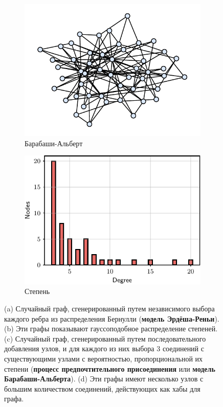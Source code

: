\begin{figure}[t]
\begin{subfigure}[b]{0.24\textwidth}
    \includegraphics[width=\textwidth]{images/graph_2}
    \caption{Барабаши-Альберт}
    \end{subfigure}
    \begin{subfigure}[b]{0.24\textwidth}
    \includegraphics[width=\textwidth]{images/graph_2_degree}
    \caption{Степень}
    \end{subfigure}
    \caption{(a) Случайный граф, сгенерированный путем независимого выбора каждого ребра из распределения Бернулли (\textbf{модель Эрдёша-Реньи}). (b) Эти графы показывают гауссоподобное распределение степеней. (c) Случайный граф, сгенерированный путем последовательного добавления узлов, и для каждого из них выбора $3$ соединений с существующими узлами с вероятностью, пропорциональной их степени (\textbf{процесс предпочтительного присоединения} или \textbf{модель Барабаши-Альберта}). (d) Эти графы имеют несколько узлов с большим количеством соединений, действующих как хабы для графа.}
    \label{fig:random_graphs}
\end{figure}

